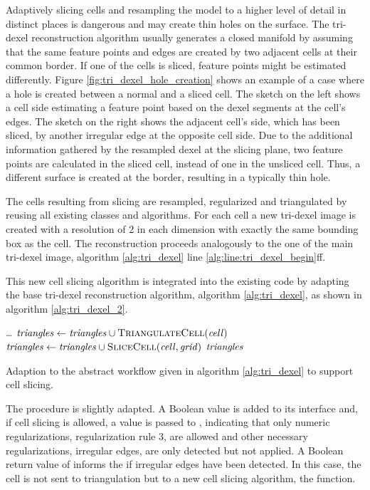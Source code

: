 Adaptively slicing cells and resampling the model to a higher level of detail in distinct places is dangerous and may create thin holes on the surface.
The tri-dexel reconstruction algorithm usually generates a closed manifold by assuming that the same feature points and edges are created by two adjacent cells at their common border.
If one of the cells is sliced, feature points might be estimated differently.
Figure \ref{fig:tri_dexel_hole_creation} shows an example of a case where a hole is created between a normal and a sliced cell.
The sketch on the left shows a cell side estimating a feature point based on the dexel segments at the cell's edges.
The sketch on the right shows the adjacent cell's side, which has been sliced, \eg by another irregular edge at the opposite cell side.
Due to the additional information gathered by the resampled dexel at the slicing plane, two feature points are calculated in the sliced cell, instead of one in the unsliced cell.
Thus, a different surface is created at the border, resulting in a typically thin hole.

The cells resulting from slicing are resampled, regularized and triangulated by reusing all existing classes and algorithms.
For each cell a new tri-dexel image is created with a resolution of 2 in each dimension with exactly the same bounding box as the cell.
The reconstruction proceeds analogously to the one of the main tri-dexel image, \cf algorithm \ref{alg:tri_dexel} line \ref{alg:line:tri_dexel_begin}ff. %

This new cell slicing algorithm is integrated into the existing code by adapting the base tri-dexel reconstruction algorithm, algorithm \ref{alg:tri_dexel}, as shown in algorithm \ref{alg:tri_dexel_2}.
%
\begin{algorithm}
	\centering
	\begin{algorithmic}[1]
		\hfill\break
			\hspace*{\dimexpr\algorithmicindent*1}\dots
					\State $\var{triangles} \gets \var{triangles} \cup \Call{TriangulateCell}{\var{cell}}$
				\Else
					\State $\var{triangles} \gets \var{triangles} \cup \Call{SliceCell}{\var{cell}, \var{grid}}$
				\EndIf
			\EndFor
			\State \Return $\mathit{triangles}$
		\EndFunction
	\end{algorithmic}
	\caption{
		Adaption to the abstract workflow given in algorithm \ref{alg:tri_dexel} to support cell slicing.
	}
	\label{alg:tri_dexel_2}
\end{algorithm}
%
The  procedure is slightly adapted.
A Boolean value is added to its interface and, if cell slicing is allowed, a value \True is passed to , indicating that only numeric regularizations, \cf regularization rule 3, are allowed and other necessary regularizations, \ie irregular edges, are only detected but not applied.
A Boolean return value of  informs the if irregular edges have been detected.
In this case, the cell is not sent to triangulation but to a new cell slicing algorithm, the  function.

